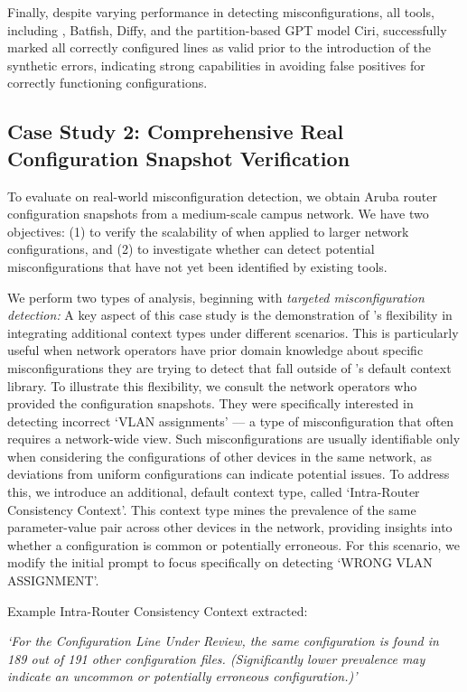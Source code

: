 Finally, despite varying performance in detecting misconfigurations, all tools, including \sysname{}, Batfish, Diffy, and the partition-based GPT model Ciri, successfully marked all correctly configured lines as valid prior to the introduction of the synthetic errors, indicating strong capabilities in avoiding false positives for correctly functioning configurations. 

\subsection{Case Study 2: Comprehensive Real Configuration Snapshot Verification}
To evaluate \sysname{} on real-world misconfiguration detection, we obtain
Aruba router configuration snapshots from a medium-scale campus network. We
have two objectives: (1) to verify the scalability of \sysname{} when applied to larger network configurations, and (2) to investigate whether \sysname{} can detect potential misconfigurations that have not yet been identified by existing tools.

We perform two types of analysis, beginning with \textit{targeted misconfiguration detection:} A key aspect of this case study is the demonstration of \sysname{}'s flexibility in integrating additional context types under different scenarios. This is particularly useful when network operators have prior domain knowledge about specific misconfigurations they are trying to detect that fall outside of \sysname{}'s default context library.
To illustrate this flexibility, we consult the network operators who provided the configuration snapshots. They were specifically interested in detecting incorrect `VLAN assignments' --- a type of misconfiguration that often requires a network-wide view. Such misconfigurations are usually identifiable only when considering the configurations of other devices in the same network, as deviations from uniform configurations can indicate potential issues.
To address this, we introduce an additional, default context type, called `Intra-Router Consistency Context'.  This context type mines  the prevalence of the same parameter-value pair across other devices in the network, providing insights into whether a configuration is common or potentially erroneous. For this scenario, we modify the initial prompt to focus specifically on detecting `WRONG VLAN ASSIGNMENT'.

Example Intra-Router Consistency Context extracted:

\textit{`For the Configuration Line Under Review, the same configuration is found in 189 out of 191 other configuration files. (Significantly lower prevalence may indicate an uncommon or potentially erroneous configuration.)'}

